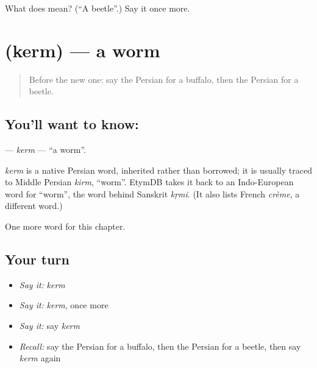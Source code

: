 \begin{tcolorbox}[breakable,colback=teal!4,colframe=teal!35!black,title={Before you move on}]
What does  mean? (\textquotedblleft{}A beetle\textquotedblright{}.) Say it once more.
\end{tcolorbox}
\section[\texorpdfstring{\fa{کرم} (kerm)}{کرم (kerm)}]{ (kerm) — a worm}

\label{lesson:FA-C121-kerm}



\begin{quote}
Before the new one: say the Persian for a buffalo, then the Persian for a beetle.
\end{quote}

\subsection*{You'll want to know: }
\textbf{} — \emph{kerm} — \textquotedblleft{}a worm\textquotedblright{}.

\begin{cousinweb}
\emph{kerm} is a native Persian word, inherited rather than borrowed; it is usually traced to Middle Persian \emph{kirm}, \textquotedblleft{}worm\textquotedblright{}. EtymDB takes it back to an Indo-European word for \textquotedblleft{}worm\textquotedblright{}, the word behind Sanskrit \emph{kṛmi}. (It also lists French \emph{crème}, a different word.)
\end{cousinweb}

\begin{grammarlens}[title={What you've built}]
One more word for this chapter.
\end{grammarlens}

\subsection*{Your turn}
\begin{itemize}
\raggedright
  \item \emph{Say it:} \emph{kerm}
  \item \emph{Say it:} \emph{kerm}, once more
  \item \emph{Say it:} say \emph{kerm}
  \item \emph{Recall:} say the Persian for a buffalo, then the Persian for a beetle, then say \emph{kerm} again
\end{itemize}


